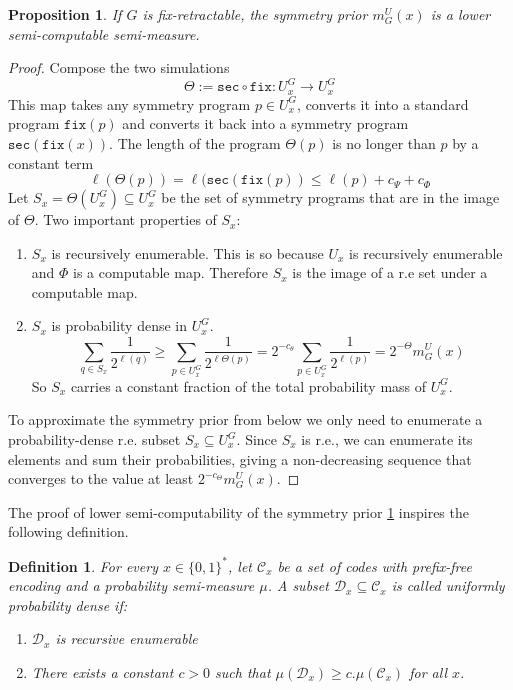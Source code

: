 \documentclass{article}
\newtheorem{proposition}[theorem]{Proposition}
\newtheorem{definition}[theorem]{Definition}
\newcommand{\bin}{\{0,1\}^*} %
\newcommand{\ms}{m^U_G}
\newcommand{\fix}{\mathtt{fix}}
\newcommand{\s}{\mathtt{sec}}
\begin{document}
\begin{proposition}
    \label{thm:lsc}
    If $G$ is fix-retractable, the symmetry prior $\ms(x)$ is a lower semi-computable semi-measure.
\end{proposition}
\begin{proof}
Compose the two simulations
\begin{equation}
    \Theta := \s \circ \fix : U^G_x \to U^G_x
\end{equation}
This map takes any symmetry program $p \in U^G_x$, converts it into a standard program $\fix(p)$ and converts it back into a symmetry program $\s(\fix(x))$. 
The length of the program $\Theta(p)$ is no longer than $p$ by a constant term
\begin{equation}
    \ell(\Theta(p)) = \ell(\s(\fix(p)) \leq \ell(p) + c_{\Psi} + c_{\Phi}
\end{equation}
Let $S_x = \Theta(U^G_x) \subseteq U^G_x$ be the set of symmetry programs that are in the image of $\Theta$. Two important properties of $S_x$:

\begin{enumerate}
    \item $S_x$ is recursively enumerable. This is so because $U_x$ is recursively enumerable and $\Phi$ is a computable map. Therefore $S_x$ is the image of a r.e set under a computable map. 
    \item $S_x$ is probability dense in $U^G_x$. 
        \begin{equation}
            \sum_{q \in S_x} \frac{1}{2^{\ell(q)}} \geq \sum_{p \in U_x^G} \frac{1}{2^{\ell{\Theta(p)}}} = 2^{-c_{\theta}}\sum_{p \in U_x^G} \frac{1}{2^{\ell(p)}} = 2^{-\Theta} \ms(x)
        \end{equation}
    So $S_x$ carries a constant fraction of the total probability mass of $U^G_x$.
\end{enumerate}
To approximate the symmetry prior from below we only need to enumerate a probability-dense r.e. subset $S_x \subseteq U^G_x$. Since $S_x$ is r.e., we can enumerate its elements and sum their probabilities, giving a non-decreasing sequence that converges to the value at least $2^{-c_{\Theta}} \ms(x)$.
\end{proof}

The proof of lower semi-computability of the symmetry prior \ref{thm:lsc} inspires the following definition. 

\begin{definition}
    For every $x \in \bin$, let $\mathcal{C}_x$ be a set of codes with prefix-free encoding and a probability semi-measure $\mu$. A subset $
    \mathcal{D}_x \subseteq \mathcal{C}_x$ is called \emph{uniformly probability dense} if:
    \begin{enumerate}
        \item $\mathcal{D}_x$ is recursive enumerable
        \item There exists a constant $c > 0$ such that $\mu(\mathcal{D}_x) \geq c.\mu(\mathcal{C}_x)$ for all $x$. 
    \end{enumerate}
\end{definition}
\end{document}
